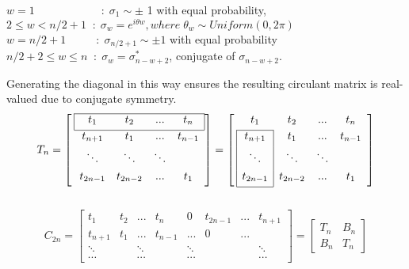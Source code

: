	$w=1\qquad \qquad \qquad : \; \sigma_{1} \sim \pm$ 1 with equal probability,
	\\[1em]
	$2 \le w < n/2+1 \; \; : \; \sigma_{w}=e^{i\theta w}, where \; {\theta}_{w} \sim Uniform(0,2\pi) $
	\\[1em]
	$w=n/2+1 \qquad \; \; \, : \; \sigma_{n/2+1} \sim \pm 1 $ with equal probability 
	\\[1em]
	
	$n/2+2 \le w \le n \; \; : \; \sigma_{w}=\sigma^{*}_{n-w+2}$, conjugate of  $\sigma_{n-w+2}$.
	
	$$
	$$
	Generating the diagonal in this way ensures the resulting circulant matrix is real-valued due 
	to conjugate symmetry.
	$$
	T_{n} = \left[ \: 
	\begin{array}{*{4}{c}}
	\cline{1-4}
	\multicolumn{1}{|c}{t_{1}} & t_{2} & ...& \multicolumn{1}{c|}{t_{n}}           \\[0.3em]
	\cline{1-4}
	t_{n+1} & t_{1} & ... & t_{n-1} \\[0.3em]
	\ddots &\ddots & \ddots &    \\[0.3em]
	t_{2n-1} & t_{2n-2} & ... & t_{1}      \\[0.3em]    
	\end{array}
	\right]
	=
	\left[ \:
	\begin{array}{*{4}{c}}
	t_{1} & t_{2} & ...& t_{n}        \\[0.3em]
	\cline{1-1}
	\multicolumn{1}{|c|}{t_{n+1}} & t_{1} & ... & t_{n-1} \\[0.3em]
	\multicolumn{1}{|c|}{\ddots} & \ddots & \ddots &    \\[0.3em]
	\multicolumn{1}{|c|}{t_{2n-1}} & t_{2n-2} & ... & t_{1}          \\[0.3em]
	\cline{1-1}
	\end{array}
	\right]
	$$
	\\
	$$
	C_{2n} =\begin{bmatrix}
	t_{1}   & t_{2} & ...    & t_{n}  & 0   & t_{2n-1} & ... &  t_{n+1}   \\[0.3em]
	t_{n+1} & t_{1} & ...    & t_{n-1}& ... & 0  & ... &          \\[0.3em]
	\ddots  &       & \ddots &        & \ddots & & &\ddots    \\[0.3em]
	\cdots  &       & \cdots &       & \cdots & & & \cdots
	\end{bmatrix}
	=
	\begin{bmatrix}
	T_{n} & B_{n}            \\[0.3em]
	B_{n} & T_{n}   
	\end{bmatrix}
	$$
	
